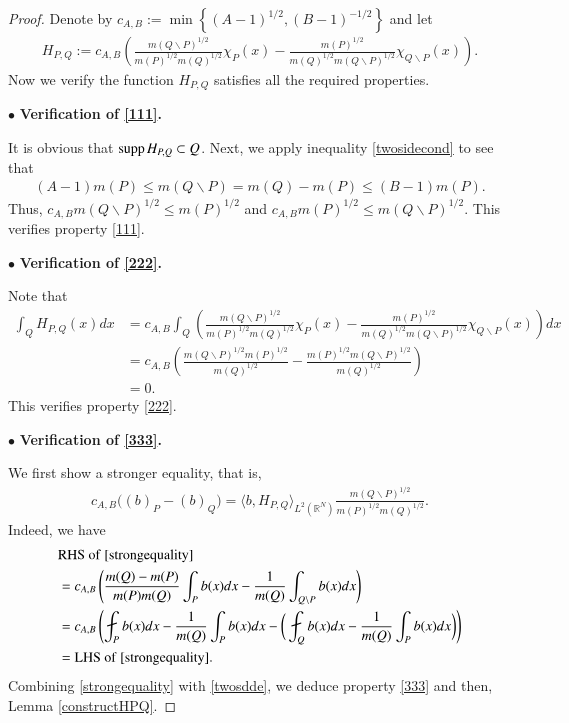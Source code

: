\documentclass[12pt]{amsart}
\begin{document}
\begin{proof}
Denote by $c_{A,B}:=\min\left\{(A-1)^{1/2},(B-1)^{-1/2}\right\}$ and let
\begin{align*}
H_{P,Q}:=c_{A,B}\left(\frac{m(Q\backslash P)^{1/2}}{m(P)^{1/2}m(Q)^{1/2}}\chi_P(x)-\frac{m(P)^{1/2}}{m(Q)^{1/2}m(Q\backslash P)^{1/2}}\chi_{Q\backslash P}(x)\right).
\end{align*}
Now we verify the function $H_{P,Q}$ satisfies all the required properties.

$\bullet $ {\bf Verification of \eqref{111}.}

It is obvious that ${\rm supp}{\hspace{.05cm}} H_{P,Q}\subset Q$. Next, we apply inequality \eqref{twosidecond} to see that
\begin{align}\label{twosdde}
(A-1)m(P)\leq m(Q\backslash P)=m(Q)-m(P)\leq (B-1)m(P).
\end{align}
Thus, $c_{A,B}m(Q\backslash P)^{1/2}\leq m(P)^{1/2}$ and $c_{A,B}m(P)^{1/2}\leq m(Q\backslash P)^{1/2}.$  This verifies property \eqref{111}.

$\bullet $ {\bf Verification of \eqref{222}.}

Note that
\begin{align*}
\int_Q H_{P,Q}(x)dx&=c_{A,B}\int_Q \left(\frac{m(Q\backslash P)^{1/2}}{m(P)^{1/2}m(Q)^{1/2}}\chi_P(x)-\frac{m(P)^{1/2}}{m(Q)^{1/2}m(Q\backslash P)^{1/2}}\chi_{Q\backslash P}(x)\right)dx\\
&=c_{A,B}\left(\frac{m(Q\backslash P)^{1/2}m(P)^{1/2}}{m(Q)^{1/2}}-\frac{m(P)^{1/2}m(Q\backslash P)^{1/2}}{m(Q)^{1/2}}\right)\\
&=0.
\end{align*}
This verifies property \eqref{222}.

$\bullet $ {\bf Verification of \eqref{333}.}

We first show a stronger equality, that is,
\begin{align}\label{strongequality}
c_{A,B}\big((b)_P-(b)_Q\big)=\langle b,H_{P,Q}\rangle_{L^2(\mathbb{R}^N)} \frac{m(Q\backslash P)^{1/2}}{m(P)^{1/2}m(Q)^{1/2}}.
\end{align}
Indeed, we have
\begin{align*}
&{\rm RHS}\ {\rm of}\ \eqref{strongequality}\\
&=c_{A,B}\left(\frac{m(Q)-m(P)}{m(P)m(Q)}\int_P b(x)dx-\frac{1}{m(Q)}\int_{Q\backslash P}b(x)dx\right)\\
&=c_{A,B}\left(\fint_Pb(x)dx-\frac{1}{m(Q)}\int_Pb(x)dx-\bigg(\fint_Qb(x)dx-\frac{1}{m(Q)}\int_Pb(x)dx\bigg)\right)\\
&={\rm LHS}\ {\rm of}\ \eqref{strongequality}.
\end{align*}
Combining \eqref{strongequality} with \eqref{twosdde}, we deduce property \eqref{333} and then, Lemma \ref{constructHPQ}.
\end{proof}
\end{document}
